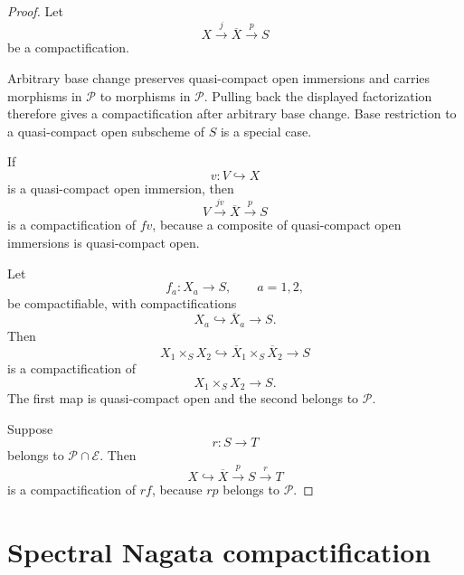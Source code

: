 \begin{proof}
Let
\[
    X
    \xrightarrow{j}
    \overline X
    \xrightarrow{p}
    S
\]
be a compactification.

Arbitrary base change preserves quasi-compact open immersions and carries
morphisms in \(\mathcal P\) to morphisms in \(\mathcal P\).  Pulling back
the displayed factorization therefore gives a compactification after
arbitrary base change.  Base restriction to a quasi-compact open subscheme
of \(S\) is a special case.

If
\[
    v:V\hookrightarrow X
\]
is a quasi-compact open immersion, then
\[
    V
    \xrightarrow{jv}
    \overline X
    \xrightarrow{p}
    S
\]
is a compactification of \(fv\), because a composite of quasi-compact open
immersions is quasi-compact open.

Let
\[
    f_a:X_a\longrightarrow S,
    \qquad
    a=1,2,
\]
be compactifiable, with compactifications
\[
    X_a
    \hookrightarrow
    \overline X_a
    \longrightarrow
    S.
\]
Then
\[
    X_1\times_SX_2
    \hookrightarrow
    \overline X_1\times_S\overline X_2
    \longrightarrow
    S
\]
is a compactification of
\[
    X_1\times_SX_2\longrightarrow S.
\]
The first map is quasi-compact open and the second belongs to
\(\mathcal P\).

Suppose
\[
    r:S\longrightarrow T
\]
belongs to \(\mathcal P\cap\mathcal E\).  Then
\[
    X
    \hookrightarrow
    \overline X
    \xrightarrow{p}
    S
    \xrightarrow{r}
    T
\]
is a compactification of \(rf\), because \(rp\) belongs to
\(\mathcal P\).
\end{proof}

\section{Spectral Nagata compactification}
\label{sec:spectral-nagata}

